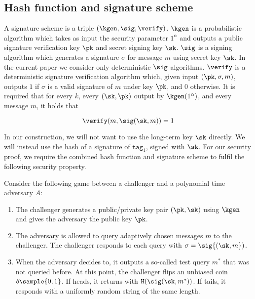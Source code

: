 \documentclass{article}
\begin{document}
{%

\subsection{Hash function and signature scheme}
A signature scheme is a triple $(\kgen, \sig, \verify)$. $\kgen$ is a probabilistic algorithm which takes as input the security parameter $1^\alpha$ and outputs a public signature verification key $\pk$ and secret signing key $\sk$. $\sig$ is a signing algorithm which generates a signature $\sigma$ for message $m$ using secret key $\sk$. In the current paper we consider only deterministic $\sig$ algorithms. $\verify$ is a deterministic signature verification algorithm which, given input $(\pk, \sigma, m)$, outputs $1$ if $\sigma$ is a valid signature of $m$ under key $\pk$, and $0$ otherwise. It is required that for every $k$, every $(\sk, \pk)$ output by $\kgen (1^\alpha)$, and every message $m$, it holds that

$$\verify (m , \sig ({\sk, m})) = 1$$

In our construction, we will not want to use the long-term key $\sk$ directly. We will instead use the hash of a signature of $\texttt{tag}_1$, signed with $\sk$. For our security proof, we require the combined hash function and signature scheme to fulfil the following  security property.

Consider the following game between a challenger and a polynomial time adversary $A$:

\begin{enumerate}
\item The challenger generates a public/private key pair $(\pk, \sk)$ using $\kgen$ and gives the adversary the public key $\pk$. %

\item The adversary is allowed to query adaptively chosen messages $m$ to the challenger. The
challenger responds to each query with $\sigma=
\sig{(\sk, m})$. 

\item When the adversary decides to, it outputs a so-called test query $m^*$ that was not queried before. At this point, the challenger flips an unbiased coin $b \sample \{0, 1\}$. If heads, it returns with $ \texttt{H}(\sig (\sk, m^*))$. If tails, it responds with a uniformly random string of the same length.


\end{enumerate}}
\end{document}
